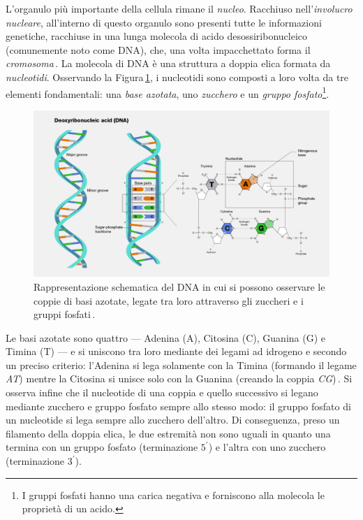 L'organulo più importante della cellula rimane il \textsl{nucleo}. Racchiuso nell'\textsl{involucro nucleare}, all'interno di questo organulo sono presenti tutte le informazioni genetiche, racchiuse in una lunga molecola di acido desossiribonucleico (comunemente noto come DNA), che, una volta impacchettato forma il \textsl{cromosoma}\,\cite{pollard2022cell, alberts2015essential}. La molecola di DNA è una struttura a doppia elica formata da \textsl{nucleotidi}. Osservando la Figura\,\ref{fig:dna}, i nucleotidi sono composti a loro volta da tre elementi fondamentali: una \textsl{base azotata}, uno \textsl{zucchero} e un \textsl{gruppo fosfato}\footnote{I gruppi fosfati hanno una carica negativa e forniscono alla molecola le proprietà di un acido.}.
% 
\begin{figure}[b!]
    \centering
    \includegraphics[width=\textwidth]{assets/dna.jpg}
    \caption[Rappresentazione schematica del DNA.]{Rappresentazione schematica del DNA in cui si possono osservare le coppie di basi azotate, legate tra loro attraverso gli zuccheri e i gruppi fosfati\,\cite{nhgri_dna_image}.}\label{fig:dna}
\end{figure}
% 
Le basi azotate sono quattro — Adenina (A), Citosina (C), Guanina (G) e Timina (T) — e si uniscono tra loro mediante dei legami ad idrogeno e secondo un preciso criterio: l'Adenina si lega solamente con la Timina (formando il legame \textit{AT}) mentre la Citosina si unisce solo con la Guanina (creando la coppia \textit{CG})\,\cite{fonseca2000hydrogen, sahu2011identification}. Si osserva infine che il nucleotide di una coppia e quello successivo si legano mediante zucchero e gruppo fosfato sempre allo stesso modo: il gruppo fosfato di un nucleotide si lega sempre allo zucchero dell'altro. Di conseguenza, preso un filamento della doppia elica, le due estremità non sono uguali in quanto una termina con un gruppo fosfato (terminazione $5^\prime$) e l'altra con uno zucchero (terminazione $3^\prime$).

